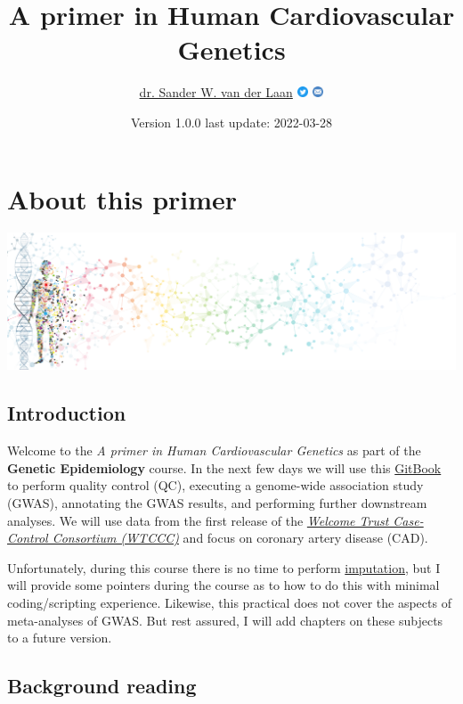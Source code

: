 \documentclass[
]{book}
\title{A primer in Human Cardiovascular Genetics}
\author{\href{https://swvanderlaan.github.iio}{dr. Sander W. van der Laan} \href{https://www.twitter.com/swvanderlaan}{\includegraphics[width=0.025\textwidth,height=\textheight]{img/_social_media/Twitter social icons - circle - blue.png}} \href{mailto:s.w.vanderlaan@gmail.com}{\includegraphics[width=0.025\textwidth,height=\textheight]{img/_social_media/Email_icon.png}}}
\date{Version 1.0.0 \textbar{} last update: 2022-03-28}
\begin{document}
\maketitle

{
\setcounter{tocdepth}{1}
\tableofcontents
}
\hypertarget{about-this-primer}{%
\chapter{About this primer}\label{about-this-primer}}

\includegraphics{img/banner_man_standing_dna.png}

\hypertarget{introduction}{%
\section{Introduction}\label{introduction}}

Welcome to the \emph{A primer in Human Cardiovascular Genetics} as part of the \textbf{Genetic Epidemiology} course. In the next few days we will use this \href{https://cjvanlissa.github.io/gitbook-demo/}{GitBook} to perform quality control (QC), executing a genome-wide association study (GWAS), annotating the GWAS results, and performing further downstream analyses. We will use data from the first release of the \href{https://www.wtccc.org.uk/ccc1/overview.html}{\emph{Welcome Trust Case-Control Consortium (WTCCC)}} and focus on coronary artery disease (CAD).

Unfortunately, during this course there is no time to perform \href{https://www.nature.com/articles/nrg2796}{imputation}, but I will provide some pointers during the course as to how to do this with minimal coding/scripting experience. Likewise, this practical does not cover the aspects of meta-analyses of GWAS. But rest assured, I will add chapters on these subjects to a future version.

\hypertarget{background-reading}{%
\section{Background reading}\label{background-reading}}
\end{document}

